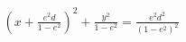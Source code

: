 \documentclass[preview]{standalone}
\begin{document}
\begin{align*}
(x+\frac{e^2d}{1-e^2})^2+\frac{y^2}{1-e^2}=\frac{e^2d^2}{(1-e^2)^2}
\end{align*}
\end{document}
